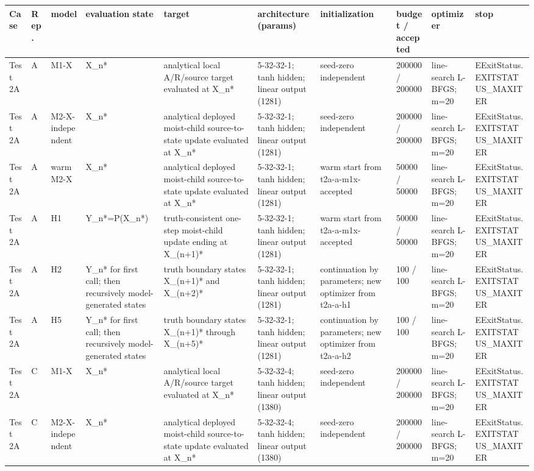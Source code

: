 \begin{tabular}{llllllllll}
\toprule
Case & Rep. & model & evaluation state & target & architecture (params) & initialization & budget / accepted & optimizer & stop \\
\midrule
Test 2A & A & M1-X & X\_n* & analytical local A/R/source target evaluated at X\_n* & 5-32-32-1; tanh hidden; linear output (1281) & seed-zero independent & 200000 / 200000 & line-search L-BFGS; m=20 & EExitStatus.EXITSTATUS\_MAXITER \\
Test 2A & A & M2-X-independent & X\_n* & analytical deployed moist-child source-to-state update evaluated at X\_n* & 5-32-32-1; tanh hidden; linear output (1281) & seed-zero independent & 200000 / 200000 & line-search L-BFGS; m=20 & EExitStatus.EXITSTATUS\_MAXITER \\
Test 2A & A & warm M2-X & X\_n* & analytical deployed moist-child source-to-state update evaluated at X\_n* & 5-32-32-1; tanh hidden; linear output (1281) & warm start from t2a-a-m1x-accepted & 50000 / 50000 & line-search L-BFGS; m=20 & EExitStatus.EXITSTATUS\_MAXITER \\
Test 2A & A & H1 & Y\_n*=P(X\_n*) & truth-consistent one-step moist-child update ending at X\_(n+1)* & 5-32-32-1; tanh hidden; linear output (1281) & warm start from t2a-a-m1x-accepted & 50000 / 50000 & line-search L-BFGS; m=20 & EExitStatus.EXITSTATUS\_MAXITER \\
Test 2A & A & H2 & Y\_n* for first call; then recursively model-generated states & truth boundary states X\_(n+1)* and X\_(n+2)* & 5-32-32-1; tanh hidden; linear output (1281) & continuation by parameters; new optimizer from t2a-a-h1 & 100 / 100 & line-search L-BFGS; m=20 & EExitStatus.EXITSTATUS\_MAXITER \\
Test 2A & A & H5 & Y\_n* for first call; then recursively model-generated states & truth boundary states X\_(n+1)* through X\_(n+5)* & 5-32-32-1; tanh hidden; linear output (1281) & continuation by parameters; new optimizer from t2a-a-h2 & 100 / 100 & line-search L-BFGS; m=20 & EExitStatus.EXITSTATUS\_MAXITER \\
Test 2A & C & M1-X & X\_n* & analytical local A/R/source target evaluated at X\_n* & 5-32-32-4; tanh hidden; linear output (1380) & seed-zero independent & 200000 / 200000 & line-search L-BFGS; m=20 & EExitStatus.EXITSTATUS\_MAXITER \\
Test 2A & C & M2-X-independent & X\_n* & analytical deployed moist-child source-to-state update evaluated at X\_n* & 5-32-32-4; tanh hidden; linear output (1380) & seed-zero independent & 200000 / 200000 & line-search L-BFGS; m=20 & EExitStatus.EXITSTATUS\_MAXITER \\

\end{tabular}
